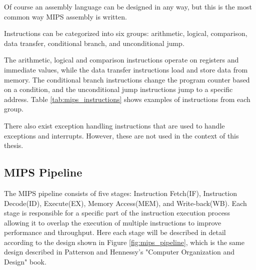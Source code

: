 Of course an assembly language can be designed in any way, but this is the most common way MIPS assembly is written.

Instructions can be categorized into six groups: arithmetic, logical, comparison, data transfer, conditional branch, and unconditional jump. 

The arithmetic, logical and comparison instructions operate on registers and immediate values, while the data transfer instructions load and store data from memory. The conditional branch instructions change the program counter based on a condition, and the unconditional jump instructions jump to a specific address. Table \ref{tab:mips_instructions} shows examples of instructions from each group.
\begin{table}[H]
    \centering
    \caption{Example MIPS Assembly Instructions for Each Group}
    \label{tab:mips_instructions}
\end{table}

There also exist exception handling instructions that are used to handle exceptions and interrupts. However, these are not used in the context of this thesis.

\subsection{MIPS Pipeline}\label{sec:mips_pipeline}
The MIPS pipeline consists of five stages: Instruction Fetch(IF), Instruction Decode(ID), Execute(EX), Memory Access(MEM), and Write-back(WB). Each stage is responsible for a specific part of the instruction execution process allowing it to overlap the execution of multiple instructions to improve performance and throughput. Here each stage will be described in detail according to the design shown in Figure \ref{fig:mips_pipeline}, which is the same design described in Patterson and Hennessy's "Computer Organization and Design" book\cite{patterson1994computer}.

